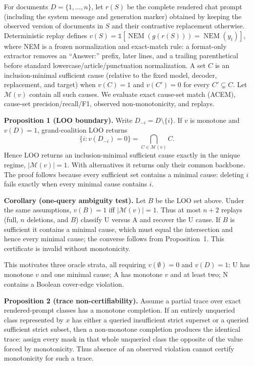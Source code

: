 \documentclass{article}
\begin{document}
For documents $D=\{1,\ldots,n\}$, let $r(S)$ be the complete rendered chat
prompt (including the system message and generation marker) obtained by
keeping the observed version of documents in $S$ and their contrastive
replacement otherwise. Deterministic replay defines
$v(S)=\mathbb{1}[\operatorname{NEM}(g(r(S)))=\operatorname{NEM}(y_t)]$, where
NEM is a frozen normalization and exact-match rule: a format-only extractor
removes an ``Answer:'' prefix, later lines, and a trailing parenthetical before
standard lowercase/article/punctuation normalization. A set $C$ is an
inclusion-minimal sufficient cause (relative to the fixed model, decoder,
replacement, and target) when $v(C)=1$ and $v(C')=0$ for every
$C'\subsetneq C$. Let
$\mathcal{M}(v)$ contain all such causes. We evaluate exact cause-set match
(ACEM), cause-set precision/recall/F1, observed non-monotonicity, and replays.

\textbf{Proposition 1 (LOO boundary).}
Write $D_{-i}=D\setminus\{i\}$. If $v$ is monotone and $v(D)=1$,
grand-coalition LOO returns
\begin{equation}
 \{i:v(D_{-i})=0\}=\bigcap_{C\in\mathcal{M}(v)} C.
\end{equation}
Hence LOO returns an inclusion-minimal sufficient cause exactly in the unique
regime, $|\mathcal{M}(v)|=1$. With alternatives it returns only their common
backbone. The proof follows because every
sufficient set contains a minimal cause: deleting $i$ fails exactly when every
minimal cause contains $i$.

\textbf{Corollary (one-query ambiguity test).} Let $B$ be the LOO set above.
Under the same assumptions, $v(B)=1$ iff $|\mathcal{M}(v)|=1$. Thus at most
$n+2$ replays (full, $n$ deletions, and $B$) classify U versus A and recover the
U cause. If $B$ is sufficient it contains a minimal cause, which must equal the
intersection and hence every minimal cause; the converse follows from
Proposition~1. This certificate is invalid without monotonicity.

This motivates three oracle strata, all requiring $v(\emptyset)=0$ and $v(D)=1$:
U has monotone $v$ and one minimal cause; A has monotone $v$ and at least two;
N contains a Boolean cover-edge violation.

\textbf{Proposition 2 (trace non-certifiability).}
Assume a partial trace over exact rendered-prompt classes has a monotone
completion. If an entirely unqueried class represented by $x$ has either a
queried insufficient strict superset or a queried sufficient strict subset,
then a non-monotone completion produces the identical trace: assign every mask
in that whole unqueried class the opposite of the value forced by monotonicity.
Thus absence of an
observed violation cannot certify monotonicity for such a trace.
\end{document}
